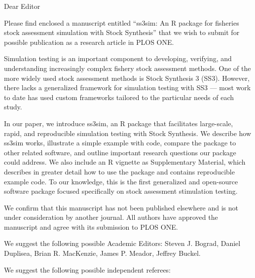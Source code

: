 \documentclass[letterpaper,11pt]{letter}
\begin{document}
\begin{letter}{}
\pagestyle{empty}
\opening{Dear Editor}


Please find enclosed a manuscript entitled ``ss3sim: An R package for fisheries
stock assessment simulation with Stock Synthesis'' that we wish to submit for
possible publication as a research article in PLOS ONE.

Simulation testing is an important component to developing, verifying, and
understanding increasingly complex fishery stock assessment methods. One of the
more widely used stock assessment methods is Stock Synthesis 3 (SS3). However,
there lacks a generalized framework for simulation testing with SS3 --- most
work to date has used custom frameworks tailored to the particular needs of
each study.

In our paper, we introduce ss3sim, an R package that facilitates large-scale,
rapid, and reproducible simulation testing with Stock Synthesis. We describe
how ss3sim works, illustrate a simple example with code, compare the package to
other related software, and outline important research questions our package
could address. We also include an R vignette as Supplementary Material, which
describes in greater detail how to use the package and contains reproducible
example code. To our knowledge, this is the first generalized and open-source
software package focused specifically on stock assessment stimulation testing.

We confirm that this manuscript has not been published elsewhere and is not
under consideration by another journal. All authors have approved the
manuscript and agree with its submission to PLOS ONE.

We suggest the following possible Academic Editors:
Steven J. Bograd,
Daniel Duplisea,
Brian R. MacKenzie,
James P. Meador,
Jeffrey Buckel.

We suggest the following possible independent referees:


\end{letter}
\end{document}
